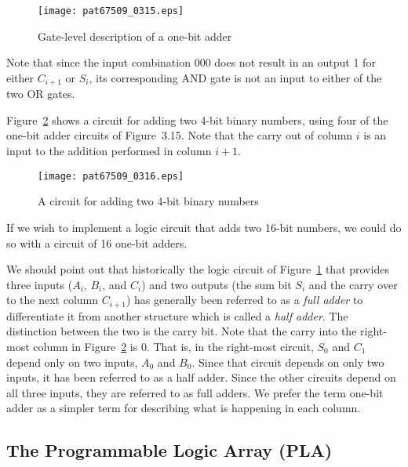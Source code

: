 \documentclass{patt}
\begin{document}
\enlargethispage{-1\baselineskip}

\begin{figure}[hb]
\vspace{-6pt}
\centerline{\texttt{[image: pat67509\_0315.eps]}}
\caption{Gate-level description of a one-bit adder}
\label{fig:fulladder}
\end{figure}

Note that since the input combination 000 does not result in an output
1 for either $C_{i+1}$ or $S_i$, its corresponding AND gate is not an
input to either of the two OR gates.

Figure~\ref{fig:4bitadder} shows a circuit for adding two 4-bit 
binary numbers, using four of the one-bit adder circuits of Figure~3.15.  
Note that the carry out of column $i$ is an input to the addition performed 
in column $i+1$.\vspace{10pt}

\begin{figure}
\centerline{\texttt{[image: pat67509\_0316.eps]}}
\caption{A circuit for adding two 4-bit binary numbers}
\label{fig:4bitadder}
 \vspace{12pt}
\end{figure}

If we wish to implement a logic circuit that adds two 16-bit numbers, we 
could do so with a circuit of 16 one-bit adders.

We should point out that historically the logic circuit of 
Figure~\ref{fig:fulladder} that provides three inputs ($A_i$, $B_i$, 
and $C_i$) and two outputs (the sum bit $S_i$ and the carry over to the 
next column $C_{i+1}$) has generally been referred to as 
a {\em full adder}  
to differentiate it from another structure which is called 
a {\em half adder}.  The distinction between the two is the carry bit.  
Note that the carry into the right-most column in Figure~\ref{fig:4bitadder} 
is 0.  That is, in the right-most circuit, $S_0$ and $C_1$ depend only on two
inputs, $A_0$ and $B_0$.  Since that circuit depends on only two inputs, it has
been referred to as a half adder.  Since the other circuits depend on all three
inputs, they are referred to as full adders.  We prefer the term one-bit adder
as a simpler term for describing what is happening in each column.

\FloatBarrier
\subsection{The Programmable Logic Array (PLA)}
\end{document}

